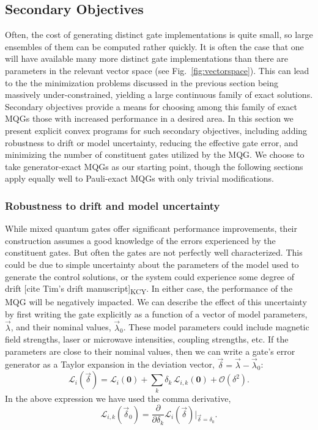 \documentclass[aps,nofootinbib,pra,notitlepage,twocolumn]{revtex4-1}
\newcommand{\order}[1]{\mathcal{O}\left( #1 \right)}
\newcommand{\kcy}[1]{{\color{red}[#1]\textsubscript{\rm{KCY}}}}
\newcommand{\genmat}{\ensuremath{{\mathcal{L}}}}
\newcommand{\0}{\ensuremath{\mathbf{0}}}
\begin{document}

\subsection{Secondary Objectives}
\noindent 
Often, the cost of generating distinct gate implementations is quite small, so large ensembles of them can be computed rather quickly. It is often the case that one will have available many more distinct gate implementations than there are parameters in the relevant vector space (see Fig.~\ref{fig:vectorspace}). This can lead to the the minimization problems discussed in the previous section being massively under-constrained, yielding a large continuous family of exact solutions. Secondary objectives provide a means for choosing among this family of exact MQGs those with increased performance in a desired area. In this section we present explicit convex programs for such secondary objectives, including adding robustness to drift or model uncertainty, reducing the effective gate error, and minimizing the number of constituent gates utilized by the MQG. We choose to take generator-exact MQGs as our starting point, though the following sections apply equally well to Pauli-exact MQGs with only trivial modifications. 

\subsubsection{Robustness to drift and model uncertainty} %
\label{sub:adding_robustness}
\noindent 
While mixed quantum gates offer significant performance improvements, their construction assumes a good knowledge of the errors experienced by the constituent gates. But often the gates are not perfectly well characterized. This could be due to simple uncertainty about the parameters of the model used to generate the control solutions, or the system could experience some degree of drift \kcy{cite Tim's drift manuscript}. In either case, the performance of the MQG will be negatively impacted. We can describe the effect of this uncertainty by first writing the gate explicitly as a function of a vector of model parameters, $\vec\lambda$, and their nominal values, $\vec\lambda_0$. These model parameters could include magnetic field strengths, laser or microwave intensities, coupling strengths, etc. If the parameters are close to their nominal values, then we can write a gate's error generator as a Taylor expansion in the deviation vector, $\vec\delta = \vec\lambda-\vec\lambda_0$:
\begin{equation}
	\label{eq:sensitivity_expansion}
	\genmat_i(\vec \delta) = \genmat_i(\0) + \sum_k \delta_k \,\genmat_{i,k}(\0) + \order{\delta^2}.
\end{equation} 
In the above expression we have used the comma derivative, 
\begin{equation}
	\genmat_{i,k}(\vec \delta_0) = \frac{\partial}{\partial \delta_k} \genmat_i(\vec\delta) \vert_{\vec \delta=\delta_0}.
\end{equation}
\end{document}
